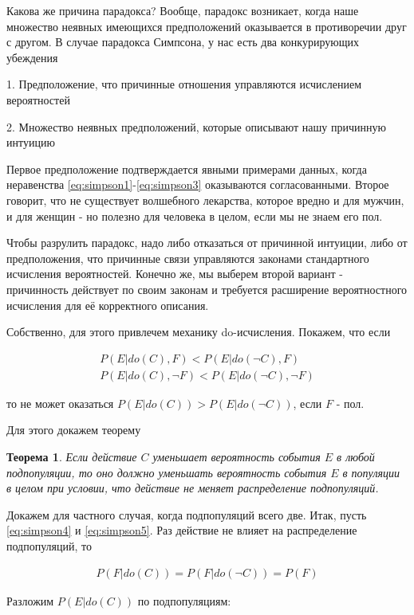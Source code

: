 \documentclass[fleqn]{article}
\newtheorem{theorem}{Теорема}
\numberwithin{equation}{section}
\numberwithin{theorem}{section}
\numberwithin{figure}{section}
\numberwithin{lemma}{section}
\numberwithin{corollary}{section}
\begin{document}
Какова же причина парадокса? Вообще, парадокс возникает, когда наше множество неявных имеющихся предположений оказывается в противоречии друг с другом. В случае парадокса Симпсона, у нас есть два конкурирующих убеждения

1. Предположение, что причинные отношения управляются исчислением вероятностей

2. Множество неявных предположений, которые описывают нашу причинную интуицию

Первое предположение подтверждается явными примерами данных, когда неравенства \ref{eq:simpson1}-\ref{eq:simpson3} оказываются согласованными. Второе говорит, что не существует волшебного лекарства, которое вредно и для мужчин, и для женщин - но полезно для человека в целом, если мы не знаем его пол.

Чтобы разрулить парадокс, надо либо отказаться от причинной интуиции, либо от предположения, что причинные связи управляются законами стандартного исчисления вероятностей. Конечно же, мы выберем второй вариант - причинность действует по своим законам и требуется расширение вероятностного исчисления для её корректного описания.

Собственно, для этого привлечем механику do-исчисления. Покажем, что если 

\begin{align}
	P(E| do(C), F) < P(E|do(\neg C), F) \label{eq:simpson4}\\
	P(E| do(C), \neg F) < P(E|do(\neg C), \neg F)\label{eq:simpson5}
\end{align} 

то не может оказаться $P(E| do(C)) > P(E| do(\neg C))$, если $F$ - пол.

Для этого докажем теорему 
\begin{theorem}
	Если действие $C$ уменьшает вероятность события $E$ в любой подпопуляции, то оно должно уменьшать вероятность события $E$ в популяции в целом при условии, что действие не меняет распределение подпопуляций.
\end{theorem}

Докажем для частного случая, когда подпопуляций всего две. Итак, пусть \ref{eq:simpson4} и \ref{eq:simpson5}. Раз действие не влияет на распределение подпопуляций, то 

\begin{align}
	P(F|do(C)) = P(F|do(\neg C)) = P(F)
\end{align}

Разложим $P(E|do(C))$ по подпопуляциям:
\end{document}
